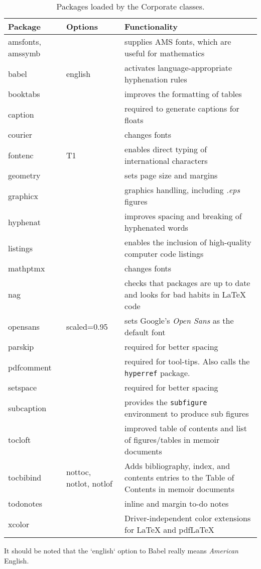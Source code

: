 \begin{table*}[!ht]
\centering
\caption[Packages loaded by the Corporate classes]{Packages loaded by the Corporate classes.}
\label{Tab:Packages}
\begin{tabular*}{\textwidth}{llp{}}
\toprule
Package & Options & Functionality\\
\midrule
amsfonts, amssymb & & supplies AMS fonts, which are useful for mathematics \\
babel & english & activates language-appropriate hyphenation rules\\
booktabs & & improves the formatting of tables \\
caption & & required to generate captions for floats\\
courier& & changes fonts \\
fontenc & T1 & enables direct typing of international characters \\
geometry & & sets page size and margins \\
graphicx & & graphics handling, including \emph{.eps} figures \\
hyphenat & & improves spacing and breaking of hyphenated words \\
listings & & enables the inclusion of high-quality computer code listings\\
mathptmx& & changes fonts \\
nag & & checks that packages are up to date and looks for bad habits in LaTeX code\\
opensans& scaled=0.95 & sets Google's \emph{Open Sans} as the default font\\
parskip & & required for better spacing\\
pdfcomment & & required for tool-tips. Also calls the \texttt{hyperref} package.\\
setspace & & required for better spacing\\
subcaption & & provides the \texttt{subfigure} environment to produce sub figures \\
tocloft & & improved table of contents and list of figures/tables in memoir documents\\
tocbibind & nottoc, notlot, notlof & Adds bibliography, index, and contents entries to the Table of Contents in memoir documents\\
todonotes & & inline and margin to-do notes \\
xcolor & & Driver-independent color extensions for LaTeX and pdfLaTeX\\
\bottomrule
\end{tabular*}
\end{table*}

It should be noted that the `english` option to Babel really means \emph{American} English.
